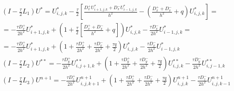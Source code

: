 \documentclass[a4paper,12pt]{article}
\begin{document}
\begin{equation}
  \begin{aligned}
   \left( I - \frac{\tau}{2} L_1 \right) U^{*} = U^*_{i,j,k} - \frac{\tau}{2} \left[ \frac{D^+_x U^*_{i+1,j,k} + D^-_x U^*_{i-1,j,k}}{h^2} - \left(\frac{D^+_x + D^-_x}{h^2} + q \right) U^*_{i,j,k} \right] = \\
= - \frac{\tau D^+_x}{2h^2} U^{*}_{i+1,j,k} + \left( 1 + \frac{\tau}{2} \left[ \frac{D^+_x + D^-_x}{h^2} + q \right] \right) U^{*}_{i,j,k} - \frac{\tau D^-_x}{2 h^2} U^{*}_{i-1,j,k} = \\
= - \frac{\tau D^+_x}{2h^2} U^{*}_{i+1,j,k} + \left( 1 + \frac{\tau D^+_x}{2h^2} + \frac{\tau D^-_x}{2h^2} + \frac{\tau q}{2} \right) U^{*}_{i,j,k} - \frac{\tau D^-_x}{2 h^2} U^{*}_{i-1,j,k} \\
   \left( I - \frac{\tau}{2} L_2 \right) U^{**} = - \frac{\tau D^+_y}{2h^2} U^{**}_{i,j+1,k} + \left( 1  + \frac{\tau D^+_y}{2h^2} + \frac{\tau D^-_y}{2h^2} + \frac{\tau q}{2} \right) U^{**}_{i,j,k} - \frac{\tau D^-_y}{2 h^2} U^{**}_{i,j-1,k}\\
   \left( I - \frac{\tau}{2} L_3 \right) U^{n+1} = - \frac{\tau D^+_z}{2h^2} U^{n+1}_{i,j,k+1} + \left( 1 + \frac{\tau D^+_z}{2h^2} + \frac{\tau D^-_z}{2h^2} + \frac{\tau q}{2} \right) U^{n+1}_{i,j,k} - \frac{\tau D^-_z}{2 h^2} U^{n+1}_{i,j,k-1}
  \end{aligned}
\end{equation}
\end{document}
